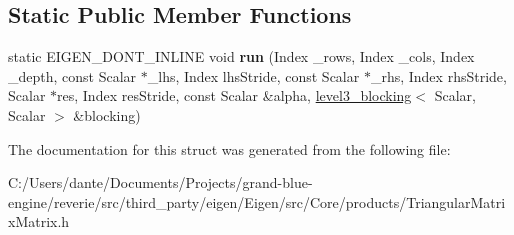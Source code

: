 \subsection*{Static Public Member Functions}
\begin{DoxyCompactItemize}
\item 
\mbox{\label{struct_eigen_1_1internal_1_1product__triangular__matrix__matrix_3_01_scalar_00_01_index_00_01_mo073ec17ef20b8a50e2a38e240dd8d795_ac2d107db311629b9fe144405b5c26ada}} 
static E\+I\+G\+E\+N\+\_\+\+D\+O\+N\+T\+\_\+\+I\+N\+L\+I\+NE void {\bfseries run} (Index \+\_\+rows, Index \+\_\+cols, Index \+\_\+depth, const Scalar $\ast$\+\_\+lhs, Index lhs\+Stride, const Scalar $\ast$\+\_\+rhs, Index rhs\+Stride, Scalar $\ast$res, Index res\+Stride, const Scalar \&alpha, \mbox{\hyperlink{class_eigen_1_1internal_1_1level3__blocking}{level3\+\_\+blocking}}$<$ Scalar, Scalar $>$ \&blocking)
\end{DoxyCompactItemize}


The documentation for this struct was generated from the following file\+:\begin{DoxyCompactItemize}
\item 
C\+:/\+Users/dante/\+Documents/\+Projects/grand-\/blue-\/engine/reverie/src/third\+\_\+party/eigen/\+Eigen/src/\+Core/products/Triangular\+Matrix\+Matrix.\+h\end{DoxyCompactItemize}
